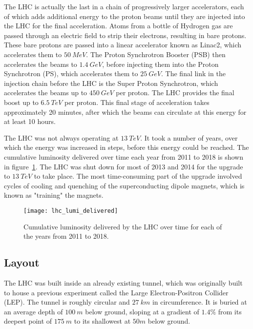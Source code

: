 The LHC is actually the last in a chain of progressively larger accelerators,
each of which adds additional energy to the proton beams until they are injected into the LHC for the final acceleration.
Atoms from a bottle of Hydrogen gas are passed through an electric field to strip their electrons,
resulting in bare protons.
These bare protons are passed into a linear accelerator known as Linac2, which accelerates them to $50~MeV$.
The Proton Synchrotron Booster (PSB) then accelerates the beams to $1.4~GeV$,
before injecting them into the Proton Synchrotron (PS), which accelerates them to $25~GeV$.
The final link in the injection chain before the LHC is the Super Proton Synchrotron,
which accelerates the beams up to $450~GeV$ per proton.
The LHC provides the final boost up to $6.5~TeV$ per proton.
This final stage of acceleration takes approximately 20 minutes, after which the beams can circulate at this energy for
at least 10 hours.

The LHC was not always operating at $13~TeV$.
It took a number of years, over which the energy was increased in steps, before this energy could be reached.
The cumulative luminosity delivered over time each year from 2011 to 2018 is shown in figure~\ref{fig:lhc_lumi_delivered}.
The LHC was shut down for most of 2013 and 2014 for the upgrade to $13~TeV$ to take place.
The most time-consuming part of the upgrade involved cycles of cooling and quenching of the superconducting dipole magnets,
which is known as "training" the magnets.

\begin{figure}[!ht]\centering
\texttt{[image: lhc\_lumi\_delivered]}
\caption{Cumulative luminosity delivered by the LHC over time for each of the years from 2011 to 2018.}
\label{fig:lhc_lumi_delivered}
\end{figure}

\subsection{Layout}\label{subsec:lhc_layout}

The LHC was built inside an already existing tunnel,
which was originally built to house a previous experiment called the Large Electron-Positron Collider (LEP).
The tunnel is roughly circular and $27~km$ in circumference.
It is buried at an average depth of $100~m$ below ground, sloping at a gradient of $1.4\%$ from its deepest point
of $175~m$ to its shallowest at $50m$ below ground.

